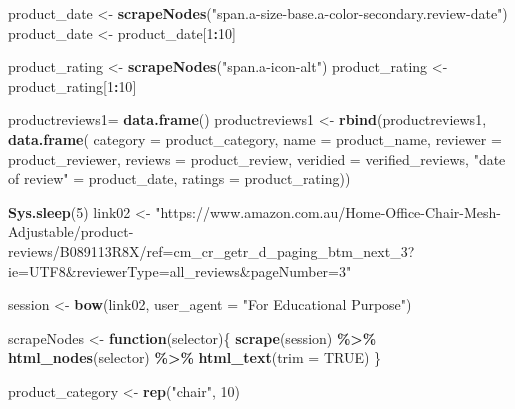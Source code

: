 \documentclass[
]{article}
\newenvironment{Shaded}{\begin{snugshade}}{\end{snugshade}}
\newcommand{\AttributeTok}[1]{\textcolor[rgb]{0.13,0.29,0.53}{#1}}
\newcommand{\ConstantTok}[1]{\textcolor[rgb]{0.56,0.35,0.01}{#1}}
\newcommand{\ControlFlowTok}[1]{\textcolor[rgb]{0.13,0.29,0.53}{\textbf{#1}}}
\newcommand{\DecValTok}[1]{\textcolor[rgb]{0.00,0.00,0.81}{#1}}
\newcommand{\FunctionTok}[1]{\textcolor[rgb]{0.13,0.29,0.53}{\textbf{#1}}}
\newcommand{\NormalTok}[1]{#1}
\newcommand{\OtherTok}[1]{\textcolor[rgb]{0.56,0.35,0.01}{#1}}
\newcommand{\SpecialCharTok}[1]{\textcolor[rgb]{0.81,0.36,0.00}{\textbf{#1}}}
\newcommand{\StringTok}[1]{\textcolor[rgb]{0.31,0.60,0.02}{#1}}
\begin{document}
\begin{Shaded}
\begin{Highlighting}[]
\NormalTok{  product\_date }\OtherTok{\textless{}{-}} \FunctionTok{scrapeNodes}\NormalTok{(}\StringTok{"span.a{-}size{-}base.a{-}color{-}secondary.review{-}date"}\NormalTok{)}
\NormalTok{  product\_date }\OtherTok{\textless{}{-}}\NormalTok{ product\_date[}\DecValTok{1}\SpecialCharTok{:}\DecValTok{10}\NormalTok{]}
  
\NormalTok{  product\_rating }\OtherTok{\textless{}{-}} \FunctionTok{scrapeNodes}\NormalTok{(}\StringTok{"span.a{-}icon{-}alt"}\NormalTok{)}
\NormalTok{  product\_rating }\OtherTok{\textless{}{-}}\NormalTok{ product\_rating[}\DecValTok{1}\SpecialCharTok{:}\DecValTok{10}\NormalTok{]}
  
\NormalTok{  productreviews1}\OtherTok{=} \FunctionTok{data.frame}\NormalTok{()}
\NormalTok{  productreviews1 }\OtherTok{\textless{}{-}} \FunctionTok{rbind}\NormalTok{(productreviews1, }\FunctionTok{data.frame}\NormalTok{(}
                      \AttributeTok{category =}\NormalTok{ product\_category,}
                      \AttributeTok{name =}\NormalTok{ product\_name,}
                      \AttributeTok{reviewer =}\NormalTok{ product\_reviewer,}
                      \AttributeTok{reviews =}\NormalTok{ product\_review,}
                      \AttributeTok{veridied =}\NormalTok{ verified\_reviews,}
                      \StringTok{"date of review"} \OtherTok{=}\NormalTok{ product\_date,}
                      \AttributeTok{ratings =}\NormalTok{ product\_rating))}

  
 \FunctionTok{Sys.sleep}\NormalTok{(}\DecValTok{5}\NormalTok{)}
\NormalTok{link02 }\OtherTok{\textless{}{-}} \StringTok{"https://www.amazon.com.au/Home{-}Office{-}Chair{-}Mesh{-}Adjustable/product{-}reviews/B089113R8X/ref=cm\_cr\_getr\_d\_paging\_btm\_next\_3?ie=UTF8\&reviewerType=all\_reviews\&pageNumber=3"}


\NormalTok{  session }\OtherTok{\textless{}{-}} \FunctionTok{bow}\NormalTok{(link02,}
               \AttributeTok{user\_agent =} \StringTok{"For Educational Purpose"}\NormalTok{)}

\NormalTok{  scrapeNodes }\OtherTok{\textless{}{-}} \ControlFlowTok{function}\NormalTok{(selector)\{}
    \FunctionTok{scrape}\NormalTok{(session) }\SpecialCharTok{\%\textgreater{}\%}
      \FunctionTok{html\_nodes}\NormalTok{(selector) }\SpecialCharTok{\%\textgreater{}\%}
      \FunctionTok{html\_text}\NormalTok{(}\AttributeTok{trim =} \ConstantTok{TRUE}\NormalTok{)}
\NormalTok{  \}}

\NormalTok{  product\_category }\OtherTok{\textless{}{-}} \FunctionTok{rep}\NormalTok{(}\StringTok{"chair"}\NormalTok{, }\DecValTok{10}\NormalTok{)}


\end{Highlighting}
\end{Shaded}
\end{document}
